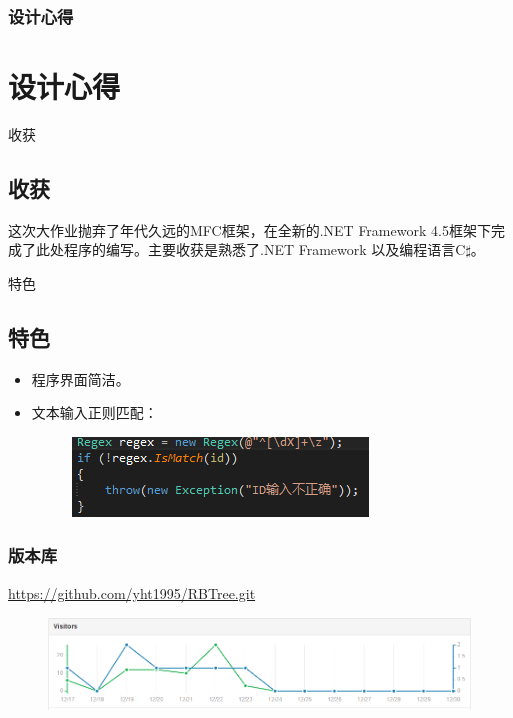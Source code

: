 \documentclass{beamer}
\begin{document}
\begin{frame}
\frametitle{设计心得}
\section{设计心得}
\begin{block}{收获}
\subsection{收获}
这次大作业抛弃了年代久远的MFC框架，在全新的.NET Framework 4.5框架下完成了此处程序的编写。主要收获是熟悉了.NET Framework 以及编程语言C$\sharp$。
\end{block}
\begin{block}{特色}
\subsection{特色}
\begin{itemize}
\item 程序界面简洁。
\item 文本输入正则匹配：
\begin{figure}[H]
\centering
\includegraphics[scale = 0.8]{6.png}
\end{figure}
\end{itemize}
\end{block}
\end{frame}

\begin{frame}
\frametitle{版本库}
\url{https://github.com/yht1995/RBTree.git}
\begin{figure}[H]
\centering
\includegraphics[scale = 0.4]{7.png}
\end{figure}
\end{frame}
\end{document}
